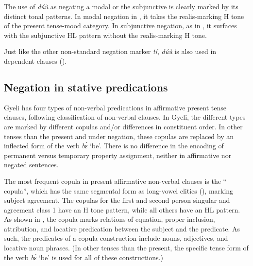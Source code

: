 \documentclass[output=paper,colorlinks=true, citecolor=brown,draftmode]{langscibook}
\begin{document}
The use of {\itshape dúù} as negating a  modal or the subjunctive  is clearly marked by its distinct tonal patterns. In modal negation in , it takes the realis-marking H tone of the present tense-mood category. In  subjunctive negation, as in , it surfaces with the subjunctive HL pattern without the realis-marking H tone. 

Just like the other non-standard negation marker {\itshape tí}, {\itshape dúù} is also used in dependent clauses (). 

\subsection{Negation in stative predications}
\label{sec:gye:Stative}

Gyeli has four types of non-verbal predications in affirmative present tense clauses, following  classification of non-verbal clauses. In Gyeli, the  different types are marked by different copulas and/or differences in constituent order. In other tenses than the present and under negation, these copulas are replaced by an inflected form of the verb {\itshape bɛ̀}  `be'. There is no difference in the encoding of permanent versus temporary property assignment, neither in affirmative nor negated sentences. 

The most frequent copula in present affirmative non-verbal clauses is the ``{\STAMP} copula'', which has the same segmental form as long-vowel {\STAMP} clitics (), marking subject agreement. The {\STAMP} copulas for the first and second person singular and agreement class 1 have an H tone pattern, while all others have an HL pattern. As shown in , the {\STAMP} copula marks relations of equation, proper inclusion, attribution, and locative predication between the subject and the predicate. As such, the predicates of a {\STAMP} copula construction include nouns, adjectives, and locative noun phrases. 
(In other tenses than the present, the specific tense form of the verb {\itshape bɛ̀} `be' is used for all of these constructions.)
\end{document}
